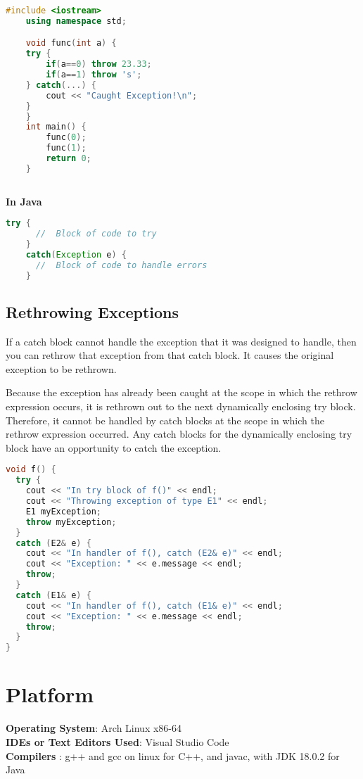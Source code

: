 \documentclass[11pt]{article}
\begin{document}
\begin{lstlisting}[language=C++]
	#include <iostream>
	using namespace std;

	void func(int a) {
	try {
		if(a==0) throw 23.33;
		if(a==1) throw 's';
	} catch(...) {
		cout << "Caught Exception!\n";
	}
	}
	int main() {
		func(0);
		func(1);
		return 0;
	}
	
\end{lstlisting}
\textbf{In Java}
\begin{lstlisting}[language=Java]
	try {
	  //  Block of code to try
	}
	catch(Exception e) {
	  //  Block of code to handle errors
	}	
\end{lstlisting}

\subsection{Rethrowing Exceptions}
If a catch block cannot handle the exception that it was designed to handle, then you can rethrow that exception from that catch block.
It causes the original exception to be rethrown.

Because the exception has already been caught at the scope in which the rethrow expression occurs, it is rethrown out to the next dynamically enclosing try block. Therefore, it cannot be handled by catch blocks at the scope in which the rethrow expression occurred. Any catch blocks for the dynamically enclosing try block have an opportunity to catch the exception.
\begin{lstlisting}[language=C++]
void f() {
  try {
	cout << "In try block of f()" << endl;
	cout << "Throwing exception of type E1" << endl;
	E1 myException;
	throw myException;
  }
  catch (E2& e) {
	cout << "In handler of f(), catch (E2& e)" << endl;
	cout << "Exception: " << e.message << endl;
	throw;
  }
  catch (E1& e) {
	cout << "In handler of f(), catch (E1& e)" << endl;
	cout << "Exception: " << e.message << endl;
	throw;
  }	
}

\end{lstlisting}
\section{Platform}
\textbf{Operating System}: Arch Linux x86-64 \\
\textbf{IDEs or Text Editors Used}: Visual Studio Code\\
\textbf{Compilers} : g++ and gcc on linux for C++, and javac, with JDK 18.0.2 for Java\\
\end{document}
